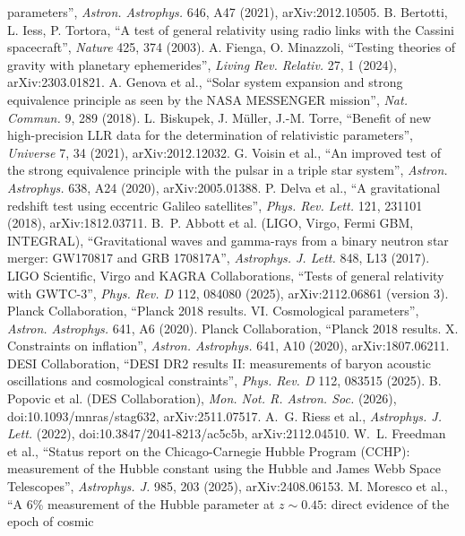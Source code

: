 parameters'', \emph{Astron. Astrophys.} 646, A47 (2021), arXiv:2012.10505.
 B. Bertotti, L. Iess, P. Tortora, ``A test of general relativity using radio links with the Cassini spacecraft'',
\emph{Nature} 425, 374 (2003).
 A. Fienga, O. Minazzoli, ``Testing theories of gravity with planetary ephemerides'', \emph{Living Rev. Relativ.} 27, 1
(2024), arXiv:2303.01821.
 A. Genova et al., ``Solar system expansion and strong equivalence principle as seen by the NASA MESSENGER mission'',
\emph{Nat. Commun.} 9, 289 (2018).
 L. Biskupek, J. M\"uller, J.-M. Torre, ``Benefit of new high-precision LLR data for the determination of relativistic
parameters'', \emph{Universe} 7, 34 (2021), arXiv:2012.12032.
 G. Voisin et al., ``An improved test of the strong equivalence principle with the pulsar in a triple star system'',
\emph{Astron. Astrophys.} 638, A24 (2020), arXiv:2005.01388.
 P. Delva et al., ``A gravitational redshift test using eccentric Galileo satellites'', \emph{Phys. Rev. Lett.} 121,
231101 (2018), arXiv:1812.03711.
 B.~P. Abbott et al. (LIGO, Virgo, Fermi GBM, INTEGRAL), ``Gravitational waves and gamma-rays from a binary neutron
star merger: GW170817 and GRB 170817A'', \emph{Astrophys. J. Lett.} 848, L13 (2017).
 LIGO Scientific, Virgo and KAGRA Collaborations, ``Tests of general relativity with GWTC-3'', \emph{Phys. Rev. D} 112,
084080 (2025), arXiv:2112.06861 (version 3).
 Planck Collaboration, ``Planck 2018 results. VI. Cosmological parameters'', \emph{Astron. Astrophys.} 641, A6 (2020).
 Planck Collaboration, ``Planck 2018 results. X. Constraints on inflation'', \emph{Astron. Astrophys.} 641, A10 (2020),
arXiv:1807.06211.
 DESI Collaboration, ``DESI DR2 results II: measurements of baryon acoustic oscillations and cosmological constraints'',
\emph{Phys. Rev. D} 112, 083515 (2025).
 B. Popovic et al. (DES Collaboration), \emph{Mon. Not. R. Astron. Soc.} (2026), doi:10.1093/mnras/stag632,
arXiv:2511.07517.
 A.~G. Riess et al., \emph{Astrophys. J. Lett.} (2022), doi:10.3847/2041-8213/ac5c5b, arXiv:2112.04510.
 W.~L. Freedman et al., ``Status report on the Chicago-Carnegie Hubble Program (CCHP): measurement of the Hubble
constant using the Hubble and James Webb Space Telescopes'', \emph{Astrophys. J.} 985, 203 (2025), arXiv:2408.06153.
 M. Moresco et al., ``A 6\% measurement of the Hubble parameter at $z\sim0.45$: direct evidence of the epoch of cosmic
